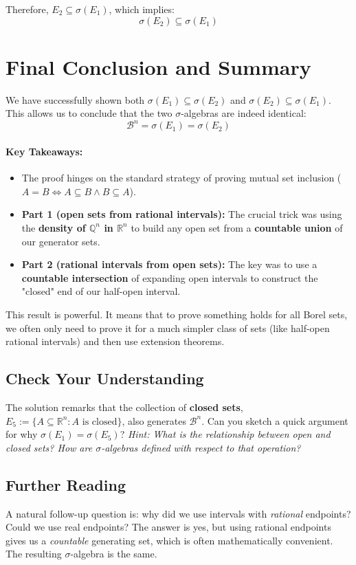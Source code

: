 \documentclass[11pt,a4paper]{article}
\theoremstyle{tutorstyle}
\begin{document}
Therefore, $E_2 \subseteq \sigma(E_1)$, which implies:
\[ \sigma(E_2) \subseteq \sigma(E_1) \]

\section*{Final Conclusion and Summary}

We have successfully shown both $\sigma(E_1) \subseteq \sigma(E_2)$ and $\sigma(E_2) \subseteq \sigma(E_1)$. This allows us to conclude that the two $\sigma$-algebras are indeed identical:
\[ \mathcal{B}^n = \sigma(E_1) = \sigma(E_2) \]

\paragraph{Key Takeaways:}
\begin{itemize}
    \item The proof hinges on the standard strategy of proving mutual set inclusion ($A=B \iff A \subseteq B \land B \subseteq A$).
    \item \textbf{Part 1 (open sets from rational intervals):} The crucial trick was using the \textbf{density of $\mathbb{Q}^n$ in $\mathbb{R}^n$} to build any open set from a \textbf{countable union} of our generator sets.
    \item \textbf{Part 2 (rational intervals from open sets):} The key was to use a \textbf{countable intersection} of expanding open intervals to construct the "closed" end of our half-open interval.
\end{itemize}

This result is powerful. It means that to prove something holds for all Borel sets, we often only need to prove it for a much simpler class of sets (like half-open rational intervals) and then use extension theorems.

\subsection*{Check Your Understanding}
The solution remarks that the collection of \textbf{closed sets}, $E_5 := \{A \subseteq \mathbb{R}^n : A \text{ is closed}\}$, also generates $\mathcal{B}^n$. Can you sketch a quick argument for why $\sigma(E_1) = \sigma(E_5)$?
\textit{Hint: What is the relationship between open and closed sets? How are $\sigma$-algebras defined with respect to that operation?}

\subsection*{Further Reading}
A natural follow-up question is: why did we use intervals with \textit{rational} endpoints? Could we use real endpoints? The answer is yes, but using rational endpoints gives us a \textit{countable} generating set, which is often mathematically convenient. The resulting $\sigma$-algebra is the same.
\end{document}
